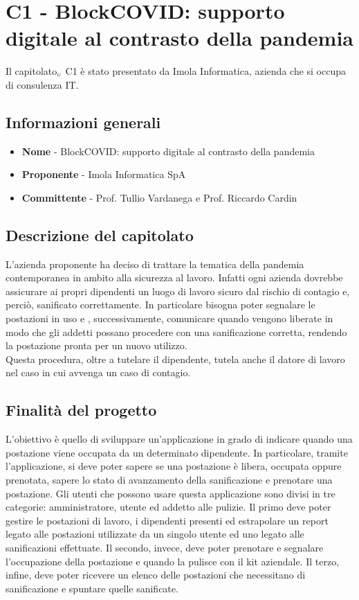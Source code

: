 \chapter{C1 - BlockCOVID: supporto digitale al contrasto della pandemia} \label{CapitolatoC1}

Il capitolato$_{\scaleto{G}{3pt}}$ C1 è stato presentato da Imola Informatica, azienda che si occupa di consulenza IT.

\section{Informazioni generali} \label{C1InformazioniGenerali}
\begin{itemize}
	\item \textbf{Nome} - BlockCOVID: supporto digitale al contrasto della pandemia
	\item \textbf{Proponente} - Imola Informatica SpA
	\item \textbf{Committente} - Prof. Tullio Vardanega e Prof. Riccardo Cardin
\end{itemize}
\section{Descrizione del capitolato} \label{C1DescrizioneDelCapitolato}
L'azienda proponente ha deciso di trattare la tematica della pandemia contemporanea in ambito alla sicurezza al lavoro. Infatti ogni azienda dovrebbe assicurare ai propri dipendenti un luogo di lavoro sicuro dal rischio di contagio e, perciò, sanificato correttamente. In particolare bisogna poter segnalare le postazioni in uso e , successivamente, comunicare quando vengono liberate in modo che gli addetti possano procedere con una sanificazione corretta, rendendo la postazione pronta per un nuovo utilizzo.\\
Questa procedura, oltre a tutelare il dipendente, tutela anche il datore di lavoro nel caso in cui avvenga un caso di contagio.
\section{Finalità del progetto} \label{C1FinalitàDelProgetto}
L'obiettivo è quello di sviluppare un'applicazione in grado di indicare quando una postazione viene occupata da un determinato dipendente. In particolare, tramite l'applicazione, si deve poter sapere se una postazione è libera, occupata oppure prenotata, sapere lo stato di avanzamento della sanificazione e prenotare una postazione. Gli utenti che possono usare questa applicazione sono divisi in tre categorie: amministratore, utente ed addetto alle pulizie. Il primo deve poter gestire le postazioni di lavoro, i dipendenti presenti ed estrapolare un report legato alle postazioni utilizzate da un singolo utente ed uno legato alle sanificazioni effettuate. Il secondo, invece, deve poter prenotare e segnalare l'occupazione della postazione e quando la pulisce con il kit aziendale. Il terzo, infine, deve poter ricevere un elenco delle postazioni che necessitano di sanificazione e spuntare quelle sanificate.
